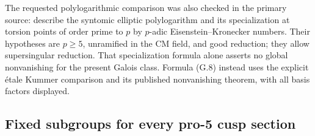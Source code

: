 The requested polylogarithmic comparison was also checked in the
primary source: \citet[Theorems 4.19 and 5.7, the latter also
Theorem 0.4]{BannaiKobayashiTsuji2010} describe the syntomic elliptic
polylogarithm and its specialization at torsion points of order
prime to $p$ by $p$-adic Eisenstein--Kronecker numbers. Their
hypotheses are $p\ge5$, unramified in the CM field, and good
reduction; they allow supersingular reduction. That specialization
formula alone asserts no global nonvanishing for the present
Galois class. Formula (G.8) instead uses the explicit étale
Kummer comparison and its published nonvanishing theorem, with
all basis factors displayed.

\subsection{Fixed subgroups for every pro-5 cusp section}

